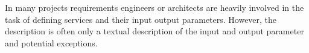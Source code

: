 \documentclass{sig-alternate-05-2015}
\begin{document}
In many projects requirements engineers or architects are heavily involved in the task of defining services and their input output parameters.
However, the description is often only a textual description of the input and output parameter and potential exceptions. 


%



%
%

\end{document}
